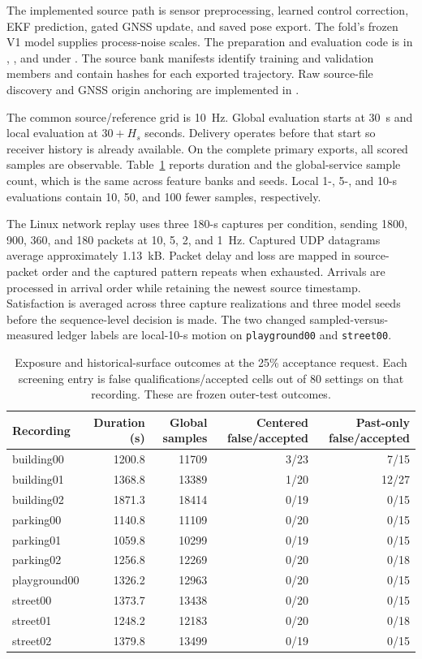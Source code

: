 \documentclass[journal]{IEEEtran}
\begin{document}
The implemented source path is sensor preprocessing, learned control
correction, EKF prediction, gated GNSS update, and saved pose export.
The fold's frozen V1 model supplies process-noise scales. The preparation
and evaluation code is in ,
, and 
under . The source bank manifests identify
training and validation members and contain hashes for each exported
trajectory. Raw source-file discovery and GNSS origin anchoring are
implemented in .

The common source/reference grid is 10~Hz. Global evaluation starts at
30~s and local evaluation at $30+H_s$ seconds. Delivery operates before
that start so receiver history is already available. On the complete
primary exports, all scored samples are observable. Table~\ref{tab:exposure}
reports duration and the global-service sample count, which is the same
across feature banks and seeds. Local 1-, 5-, and 10-s evaluations contain
10, 50, and 100 fewer samples, respectively.

The Linux network replay uses three 180-s captures per condition, sending
1800, 900, 360, and 180 packets at 10, 5, 2, and 1~Hz. Captured UDP
datagrams average approximately 1.13~kB. Packet delay and loss are mapped
in source-packet order and the captured pattern repeats when exhausted.
Arrivals are processed in arrival order while retaining the newest source
timestamp. Satisfaction is averaged across three capture realizations
and three model seeds before the sequence-level decision is made.
The two changed sampled-versus-measured ledger labels are local-10-s
motion on \texttt{playground00} and \texttt{street00}.

\begin{table}[t]
\centering
\caption{Exposure and historical-surface outcomes at the 25\% acceptance
request. Each screening entry is false qualifications/accepted cells out
of 80 settings on that recording. These are frozen outer-test outcomes.}
\label{tab:exposure}
\begin{tabular}{lrrrr}
\toprule
Recording & Duration (s) & Global samples & Centered false/accepted & Past-only false/accepted\\
\midrule
building00 & 1200.8 & 11709 & 3/23 & 7/15\\
building01 & 1368.8 & 13389 & 1/20 & 12/27\\
building02 & 1871.3 & 18414 & 0/19 & 0/15\\
parking00 & 1140.8 & 11109 & 0/20 & 0/15\\
parking01 & 1059.8 & 10299 & 0/19 & 0/15\\
parking02 & 1256.8 & 12269 & 0/20 & 0/18\\
playground00 & 1326.2 & 12963 & 0/20 & 0/15\\
street00 & 1373.7 & 13438 & 0/20 & 0/15\\
street01 & 1248.2 & 12183 & 0/20 & 0/18\\
street02 & 1379.8 & 13499 & 0/19 & 0/15\\
\bottomrule
\end{tabular}
\end{table}
\end{document}
